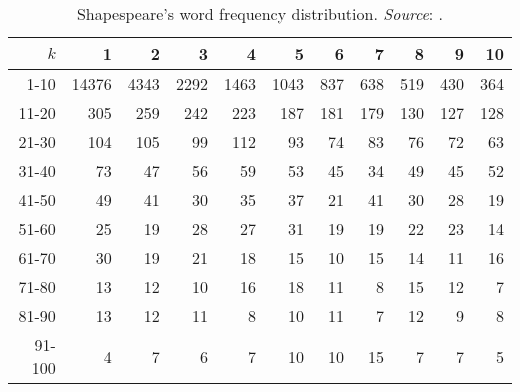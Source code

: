 \begin{table}
 \caption[Shapespeare's word frequency distribution]{Shapespeare's word frequency distribution.  \emph{Source}: \protect\citet[Table 1]{EfronThisted:76}.}\label{tab:shakewds}
 \begin{center}
 \begin{tabular}{r|rrrrrrrrrr}
 \hline
  $k$ & 1 & 2 & 3 & 4 & 5 & 6 & 7 & 8 & 9 & 10 \\ 
 \hline
  1-10 & 14376 & 4343 & 2292 & 1463 & 1043 & 837 & 638 & 519 & 430 & 364 \\ 
  11-20 & 305 & 259 & 242 & 223 & 187 & 181 & 179 & 130 & 127 & 128 \\ 
  21-30 & 104 & 105 & 99 & 112 & 93 & 74 & 83 & 76 & 72 & 63 \\ 
  31-40 & 73 & 47 & 56 & 59 & 53 & 45 & 34 & 49 & 45 & 52 \\ 
  41-50 & 49 & 41 & 30 & 35 & 37 & 21 & 41 & 30 & 28 & 19 \\ 
  51-60 & 25 & 19 & 28 & 27 & 31 & 19 & 19 & 22 & 23 & 14 \\ 
  61-70 & 30 & 19 & 21 & 18 & 15 & 10 & 15 & 14 & 11 & 16 \\ 
  71-80 & 13 & 12 & 10 & 16 & 18 & 11 & 8 & 15 & 12 & 7 \\ 
  81-90 & 13 & 12 & 11 & 8 & 10 & 11 & 7 & 12 & 9 & 8 \\ 
  91-100 & 4 & 7 & 6 & 7 & 10 & 10 & 15 & 7 & 7 & 5 \\ 
 \hline
 \end{tabular}
 \end{center}
\end{table}
